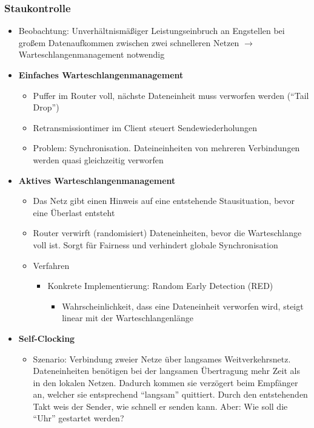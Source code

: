 \subsubsection{Staukontrolle}
\begin{itemize}
	\item Beobachtung: Unverhältnismäßiger Leistungseinbruch an Engstellen bei großem Datenaufkommen zwischen zwei schnelleren Netzen \(\rightarrow\) Warteschlangenmanagement notwendig
	\item \textbf{Einfaches Warteschlangenmanagement}
	\begin{itemize}
		\item Puffer im Router voll, nächste Dateneinheit muss verworfen werden ("`Tail Drop"')
		\item Retransmissiontimer im Client steuert Sendewiederholungen
		\item Problem: Synchronisation. Dateineinheiten von mehreren Verbindungen werden quasi gleichzeitig verworfen
	\end{itemize}
	\item \textbf{Aktives Warteschlangenmanagement}
	\begin{itemize}
		\item Das Netz gibt einen Hinweis auf eine entstehende Stausituation, bevor eine Überlast entsteht
		\item Router verwirft (randomisiert) Dateneinheiten, bevor die Warteschlange voll ist. Sorgt für Fairness und verhindert globale Synchronisation
		\item Verfahren
		\begin{itemize}
			\item Konkrete Implementierung: Random Early Detection (RED)
			\begin{itemize}
				\item Wahrscheinlichkeit, dass eine Dateneinheit verworfen wird, steigt linear mit der Warteschlangenlänge
			\end{itemize}
		\end{itemize}
	\end{itemize}
	\item \textbf{Self-Clocking}
	\begin{itemize}
		\item Szenario: Verbindung zweier Netze über langsames Weitverkehrsnetz. Dateneinheiten benötigen bei der langsamen Übertragung mehr Zeit als in den lokalen Netzen. Dadurch kommen sie verzögert beim Empfänger an, welcher sie entsprechend "`langsam"' quittiert. Durch den entstehenden Takt weis der Sender, wie schnell er senden kann. Aber: Wie soll die "`Uhr"' gestartet werden?

\end{itemize}
\end{itemize}
